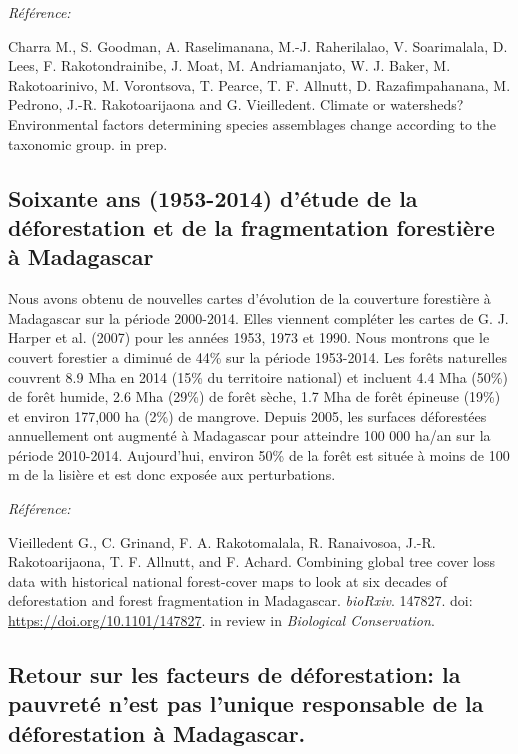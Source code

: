 \documentclass[12pt,]{article}
\begin{document}
\emph{Référence:}

Charra M., S. Goodman, A. Raselimanana, M.-J. Raherilalao, V.
Soarimalala, D. Lees, F. Rakotondrainibe, J. Moat, M. Andriamanjato, W.
J. Baker, M. Rakotoarinivo, M. Vorontsova, T. Pearce, T. F. Allnutt, D.
Razafimpahanana, M. Pedrono, J.-R. Rakotoarijaona and G. Vieilledent.
Climate or watersheds? Environmental factors determining species
assemblages change according to the taxonomic group. in prep.

\hypertarget{soixante-ans-1953-2014-detude-de-la-deforestation-et-de-la-fragmentation-forestiere-a-madagascar}{%
\subsection{Soixante ans (1953-2014) d'étude de la déforestation et de
la fragmentation forestière à
Madagascar}\label{soixante-ans-1953-2014-detude-de-la-deforestation-et-de-la-fragmentation-forestiere-a-madagascar}}

Nous avons obtenu de nouvelles cartes d'évolution de la couverture
forestière à Madagascar sur la période 2000-2014. Elles viennent
compléter les cartes de G. J. Harper et al. (2007) pour les années 1953,
1973 et 1990. Nous montrons que le couvert forestier a diminué de 44\%
sur la période 1953-2014. Les forêts naturelles couvrent 8.9 Mha en 2014
(15\% du territoire national) et incluent 4.4 Mha (50\%) de forêt
humide, 2.6 Mha (29\%) de forêt sèche, 1.7 Mha de forêt épineuse (19\%)
et environ 177,000 ha (2\%) de mangrove. Depuis 2005, les surfaces
déforestées annuellement ont augmenté à Madagascar pour atteindre 100
000 ha/an sur la période 2010-2014. Aujourd'hui, environ 50\% de la
forêt est située à moins de 100 m de la lisière et est donc exposée aux
perturbations.

\emph{Référence:}

Vieilledent G., C. Grinand, F. A. Rakotomalala, R. Ranaivosoa, J.-R.
Rakotoarijaona, T. F. Allnutt, and F. Achard. Combining global tree
cover loss data with historical national forest-cover maps to look at
six decades of deforestation and forest fragmentation in Madagascar.
\emph{bioRxiv}. 147827. doi: \url{https://doi.org/10.1101/147827}. in
review in \emph{Biological Conservation}.

\hypertarget{retour-sur-les-facteurs-de-deforestation-la-pauvrete-nest-pas-lunique-responsable-de-la-deforestation-a-madagascar.}{%
\subsection{Retour sur les facteurs de déforestation: la pauvreté n'est
pas l'unique responsable de la déforestation à
Madagascar.}\label{retour-sur-les-facteurs-de-deforestation-la-pauvrete-nest-pas-lunique-responsable-de-la-deforestation-a-madagascar.}}
\end{document}

